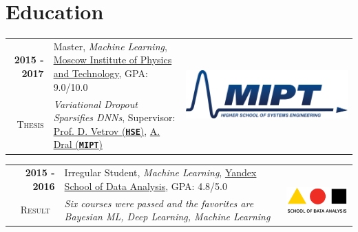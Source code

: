\documentclass[a4paper,10pt]{article} %
\begin{document}

\section{Education}

\begin{tabular}{rp{14cm}c}	
	\textbf{2015 -  2017} & Master, \emph{Machine Learning}, \href{https://mipt.ru/english}{Moscow Institute of Physics and Technology}, GPA: 9.0/10.0& \multirow{2}{*}{\includegraphics[scale=0.15]{img/mipt}}\\
	\textsc{Thesis} & \emph{Variational Dropout Sparsifies DNNs}, Supervisor: \href{https://scholar.google.ru/citations?user=7HU0UoUAAAAJ&hl=en}{Prof. D. Vetrov (\texttt{\textbf{HSE}})}, \href{https://ru.linkedin.com/in/alexey-dral}{A. Dral (\texttt{\textbf{MIPT}})}
\end{tabular}

\begin{tabular}{rp{14cm}c}	
	\textbf{2015 -  2016} & Irregular Student, \emph{Machine Learning}, \href{https://yandexdataschool.com/}{Yandex School of Data Analysis}, GPA: 4.8/5.0& \multirow{2}{*}{~~\includegraphics[scale=0.25]{img/shad}}\\
	\textsc{Result}~& \emph{Six courses were passed and the favorites are Bayesian ML, Deep Learning, Machine Learning}
\end{tabular}
\end{document}
